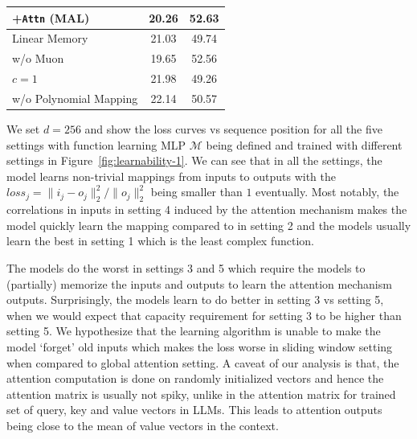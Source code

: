 \begin{minipage}[t!]{\textwidth}
\begin{minipage}[t]{0.40\textwidth}
{\begin{tabular}{l c c}
    \hspace{6pt}+\texttt{Attn} (MAL) & 20.26 & 52.63               \\
    \midrule
    Linear Memory          & 21.03   &  49.74    \\
    w/o Muon      & 19.65   &  52.56    \\
    $c = 1$                & 21.98   &  49.26    \\
    w/o Polynomial Mapping  &  22.14   &  50.57   \\
    \toprule
    \end{tabular}
    }
  \end{minipage}
\end{minipage}



We set $d = 256$ and show the loss curves vs sequence position for all the five settings with function learning MLP $\mathcal{M}$ being defined and trained with different settings in Figure~\ref{fig:learnability-1}. We can see that in all the settings, the model learns non-trivial mappings from inputs to outputs with the $loss_j = \|i_j - o_j\|_2^2/\|o_j\|_2^2$ being smaller than $1$ eventually. Most notably, the correlations in inputs in setting 4 induced by the attention mechanism makes the model quickly learn the mapping compared to in setting 2 and the models usually learn the best in setting 1 which is the least complex function.  

The models do the worst in settings 3 and 5 which require the models to (partially) memorize the inputs and outputs to learn the attention mechanism outputs. Surprisingly, the models learn to do better in setting 3 vs setting 5, when we would expect that capacity requirement for setting 3 to be higher than setting 5. We hypothesize that the learning algorithm is unable to make the model `forget' old inputs which makes the loss worse in sliding window setting when compared to global attention setting. A caveat of our analysis is that, the attention computation is done on randomly initialized vectors and hence the attention matrix is usually not spiky, unlike in the attention matrix for trained set of query, key and value vectors in LLMs. This leads to attention outputs being close to the mean of value vectors in the context.























